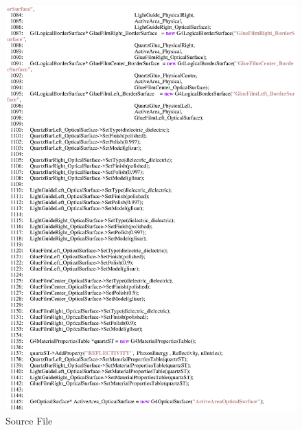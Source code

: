 \begin{figure}[ht]
  \hspace{0cm}
  \includegraphics[scale=0.8]{./figures5/QweakSimCerenkovDetector.cc-p18.eps}
  \caption{\label{SourceV18} Source File}
           \label{fig:V-SC-22}
\end{figure}
\clearpage

